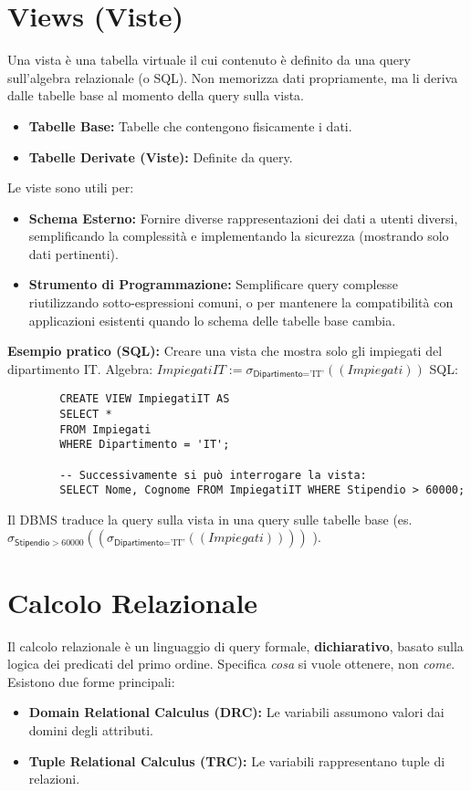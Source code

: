 \documentclass{article}
\newcommand{\Rel}[1]{\textit{#1}} %
\newcommand{\Attr}[1]{\textsf{#1}} %
\newcommand{\myselectop}[2]{\sigma_{#1}(#2)}
\begin{document}
	\section{Views (Viste)}
	Una vista è una tabella virtuale il cui contenuto è definito da una query sull'algebra relazionale (o SQL). Non memorizza dati propriamente, ma li deriva dalle tabelle base al momento della query sulla vista.
	\begin{itemize}
		\item \textbf{Tabelle Base:} Tabelle che contengono fisicamente i dati.
		\item \textbf{Tabelle Derivate (Viste):} Definite da query.
	\end{itemize}
	Le viste sono utili per:
	\begin{itemize}
		\item \textbf{Schema Esterno:} Fornire diverse rappresentazioni dei dati a utenti diversi, semplificando la complessità e implementando la sicurezza (mostrando solo dati pertinenti).
		\item \textbf{Strumento di Programmazione:} Semplificare query complesse riutilizzando sotto-espressioni comuni, o per mantenere la compatibilità con applicazioni esistenti quando lo schema delle tabelle base cambia.
	\end{itemize}
	\textbf{Esempio pratico (SQL):} Creare una vista che mostra solo gli impiegati del dipartimento IT.
	Algebra: $\Rel{ImpiegatiIT} := \myselectop{\Attr{Dipartimento} = \text{'IT'}}{(\Rel{Impiegati})}$
	SQL:
	\begin{verbatim}
		CREATE VIEW ImpiegatiIT AS
		SELECT *
		FROM Impiegati
		WHERE Dipartimento = 'IT';
		
		-- Successivamente si può interrogare la vista:
		SELECT Nome, Cognome FROM ImpiegatiIT WHERE Stipendio > 60000;
	\end{verbatim}
	Il DBMS traduce la query sulla vista in una query sulle tabelle base (es. $\myselectop{\Attr{Stipendio} > 60000}{(\myselectop{\Attr{Dipartimento} = \text{'IT'}}{(\Rel{Impiegati})})}$ ).
	
	\section{Calcolo Relazionale}
	Il calcolo relazionale è un linguaggio di query formale, \textbf{dichiarativo}, basato sulla logica dei predicati del primo ordine. Specifica \textit{cosa} si vuole ottenere, non \textit{come}.
	Esistono due forme principali:
	\begin{itemize}
		\item \textbf{Domain Relational Calculus (DRC):} Le variabili assumono valori dai domini degli attributi.
		\item \textbf{Tuple Relational Calculus (TRC):} Le variabili rappresentano tuple di relazioni.
	\end{itemize}
	
\end{document}
